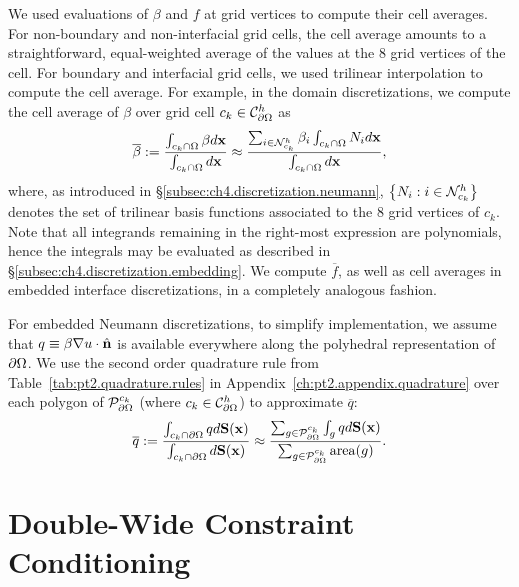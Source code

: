 We used evaluations of $\beta$ and $f$ at grid vertices to compute their cell averages. For non-boundary and non-interfacial grid cells, the cell average amounts to a straightforward, equal-weighted average of the values at the $8$ grid vertices of the cell. For boundary and interfacial grid cells, we used trilinear interpolation to compute the cell average. For example, in the domain discretizations, we compute the cell average of $\beta$ over grid cell $c_k \in \mathcal{C}^h_{\partial\Omega}$ as
\begin{equation*}
\overline{\beta} := \frac{\int_{c_k \cap \Omega} \beta d\mathbf{x}}{\int_{c_k \cap \Omega} d\mathbf{x}} \approx \frac{\sum_{i \in \mathcal{N}^h_{c_k}} \beta_i \int_{c_k \cap \Omega} N_i d\mathbf{x}}{\int_{c_k \cap \Omega} d\mathbf{x}},
\end{equation*}
where, as introduced in \S\ref{subsec:ch4.discretization.neumann}, $\left\lbrace  N_i : i \in \mathcal{N}^h_{c_k}  \right\rbrace$ denotes the set of trilinear basis functions associated to the $8$ grid vertices of $c_k$. Note that all integrands remaining in the right-most expression are polynomials, hence the integrals may be evaluated as described in \S\ref{subsec:ch4.discretization.embedding}. We compute $\overline{f}$, as well as cell averages in embedded interface discretizations, in a completely analogous fashion.

For embedded Neumann discretizations, to simplify implementation, we assume that $q \equiv \beta \nabla u \cdot \hat{\mathbf{n}}$ is available everywhere along the polyhedral representation of $\partial\Omega$. We use the second order quadrature rule from Table~\ref{tab:pt2.quadrature.rules} in Appendix~\ref{ch:pt2.appendix.quadrature} over each polygon of $\mathcal{P}^{c_k}_{\partial\Omega}$ (where $c_k \in \mathcal{C}^h_{\partial\Omega}$) to approximate $\overline{q}$:
\begin{equation*}
\overline{q} := \frac{\int_{c_k \cap \partial\Omega} q d\mathbf{S}(\mathbf{x})}{\int_{c_k \cap \partial\Omega} d\mathbf{S}(\mathbf{x})} \approx \frac{\sum_{g \in \mathcal{P}^{c_k}_{\partial\Omega}} \int_g q d\mathbf{S}(\mathbf{x})}{\sum_{g \in \mathcal{P}^{c_k}_{\partial\Omega}} \operatorname{area}(g)}.
\end{equation*}

\chapter{Double-Wide Constraint Conditioning} \label{ch:pt2.appendix.constraintconditioning}

